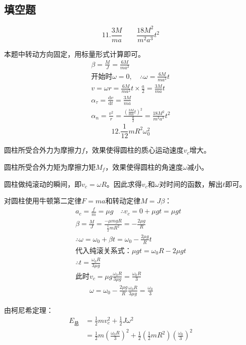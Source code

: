 \documentclass[blue, normal]{./templete/qyxfnote}
\newcommand{\di}[1]{\mathrm{d}#1}
\newcommand{\dy}[2]{\frac{\di{#1}}{\di{#2}}}
\begin{document}
\begin{multicols}{2}
	\subsection{填空题}
			\[11.\frac{3M}{ma} \hspace{2em} \frac{18M^2}{m^2a^3}t^2\]\par
			本题中转动方向固定，用标量形式计算即可。
			\begin{gather*}
			\beta=\frac{M}{J}=\frac{6M}{ma^2}\\
			\text{开始时}\omega=0,\quad\therefore \omega=\frac{6M}{ma^2}t\\
			v=\omega r=\frac{6M}{ma^2}t\times\frac{a}{2}=\frac{3M}{ma}t\\
			\alpha_{\tau}=\dy{v}{t}=\frac{3M}{ma}\\
			\alpha_n=\frac{v^2}{r}=\frac{\left(\frac{3M}{ma}t\right)^2}{\frac{a}{2}}=\frac{18M^2}{m^2a^3}t^2
			\end{gather*}
			\[12.\frac{1}{12}mR^2\omega_0^2\]\par
			圆柱所受合外力为摩擦力$f$，效果使得圆柱的质心运动速度$ v_c $增大。\par
			圆柱所受合外力矩为摩擦力矩$ M_f $，效果使得圆柱的角速度$ \omega $减小。\par
			圆柱做纯滚动的瞬间，即$ v_c=\omega R $。因此求得$ v_c $和$ \omega $对时间的函数，解出$ t $即可。\par
			对圆柱使用牛顿第二定律$F=ma$和转动定律$M=J\beta$：
			\begin{gather*}
			a_c=\frac{f}{m}=\mu g\quad\therefore v_c=0+\mu gt=\mu gt\\
			\beta=\frac{M}{J}=\frac{-\mu mgR}{\frac{1}{2}mR^2}=-\frac{2\mu g}{R}\\
			\therefore \omega=\omega_0+\beta t=\omega_0-\frac{2\mu g}{R}t\\
			\text{代入纯滚关系式：}\mu gt=\omega_0R-2\mu gt\\
			\therefore t=\frac{\omega_0R}{3\mu g}\\
			\text{此时}v_c=\mu g\frac{\omega_0R}{3\mu g}=\frac{\omega_0R}{3}\\
			\hspace{2em}\omega=\omega_0-\frac{2\mu g}{R}\frac{\omega_0R}{3\mu g}=\frac{\omega_0}{3}
			\end{gather*}\par
			由柯尼希定理：
			\begin{align*}
			E_{\text{总}}&=\frac{1}{2}mv_c^2+\frac{1}{2}J\omega^2\\
			&=\frac{1}{2}m\left(\frac{\omega_0R}{3}\right)^2+\frac{1}{2}\left(\frac{1}{2}mR^2\right)\left(\frac{\omega_0}{3}\right)^2\\

\end{align*}
\end{multicols}
\end{document}
